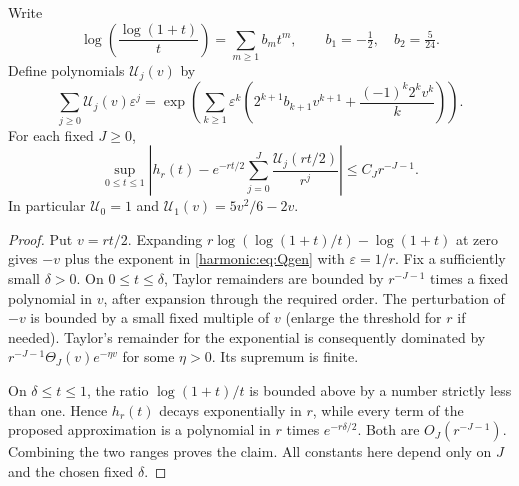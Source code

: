 \begin{lemma}\label{harmonic:lem:kernel}
Write
\begin{equation}\label{harmonic:eq:b}
 \log\left(\frac{\log(1+t)}t\right)=\sum_{m\ge1}b_mt^m,
 \qquad b_1=-\tfrac12,\quad b_2=\tfrac5{24}.
\end{equation}
Define polynomials $\mathcal U_j(v)$ by
\begin{equation}\label{harmonic:eq:Qgen}
 \sum_{j\ge0}\mathcal U_j(v)\varepsilon^j
 =\exp\left(\sum_{k\ge1}\varepsilon^k
 \left(2^{k+1}b_{k+1}v^{k+1}+\frac{(-1)^k2^kv^k}{k}\right)\right).
\end{equation}
For each fixed $J\ge0$,
\begin{equation}\label{harmonic:eq:kernelExpansion}
 \sup_{0\le t\le1}\left|
 h_r(t)-e^{-rt/2}\sum_{j=0}^J\frac{\mathcal U_j(rt/2)}{r^j}\right|
 \le C_J r^{-J-1}.
\end{equation}
In particular $\mathcal U_0=1$ and $\mathcal U_1(v)=5v^2/6-2v$.
\end{lemma}
\begin{proof}
Put $v=rt/2$. Expanding $r\log(\log(1+t)/t)-\log(1+t)$ at zero gives $-v$ plus the exponent in \eqref{harmonic:eq:Qgen} with $\varepsilon=1/r$. Fix a sufficiently small $\delta>0$. On $0\le t\le\delta$, Taylor remainders are bounded by $r^{-J-1}$ times a fixed polynomial in $v$, after expansion through the required order. The perturbation of $-v$ is bounded by a small fixed multiple of $v$ (enlarge the threshold for $r$ if needed). Taylor's remainder for the exponential is consequently dominated by $r^{-J-1}\Theta_J(v)e^{-\eta v}$ for some $\eta>0$. Its supremum is finite.

On $\delta\le t\le1$, the ratio $\log(1+t)/t$ is bounded above by a number strictly less than one. Hence $h_r(t)$ decays exponentially in $r$, while every term of the proposed approximation is a polynomial in $r$ times $e^{-r\delta/2}$. Both are $O_J(r^{-J-1})$. Combining the two ranges proves the claim. All constants here depend only on $J$ and the chosen fixed $\delta$.
\end{proof}

